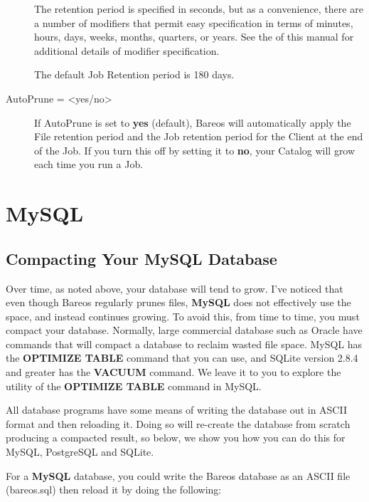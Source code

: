 \begin{description}
The retention period is specified in seconds, but as a convenience, there
are a number of modifiers that permit easy specification in terms of
minutes, hours, days, weeks, months, quarters, or years.  See the  of this manual for additional details of
modifier specification.

The default Job Retention period is 180 days.

\item [AutoPrune = {\textless}yes/no{\textgreater}]
   If AutoPrune is set to  {\bf yes} (default), Bareos will  automatically apply
the File retention period and the Job  retention period for the Client at the
end of the Job.
If you turn this off by setting it to {\bf no}, your  Catalog will grow each
time you run a Job.
\end{description}

\section{MySQL}
\label{CompactingMySQL}
\subsection{Compacting Your MySQL Database}


Over time, as noted above, your database will tend to grow. I've noticed that
even though Bareos regularly prunes files, {\bf MySQL} does not effectively
use the space, and instead continues growing. To avoid this, from time to
time, you must compact your database. Normally, large commercial database such
as Oracle have commands that will compact a database to reclaim wasted file
space. MySQL has the {\bf OPTIMIZE TABLE} command that you can use, and SQLite
version 2.8.4 and greater has the {\bf VACUUM} command. We leave it to you to
explore the utility of the {\bf OPTIMIZE TABLE} command in MySQL.

All database programs have some means of writing the database out in ASCII
format and then reloading it. Doing so will re-create the database from
scratch producing a compacted result, so below, we show you how you can do
this for MySQL, PostgreSQL and SQLite.

For a {\bf MySQL} database, you could write the Bareos database as an ASCII
file (bareos.sql) then reload it by doing the following:

